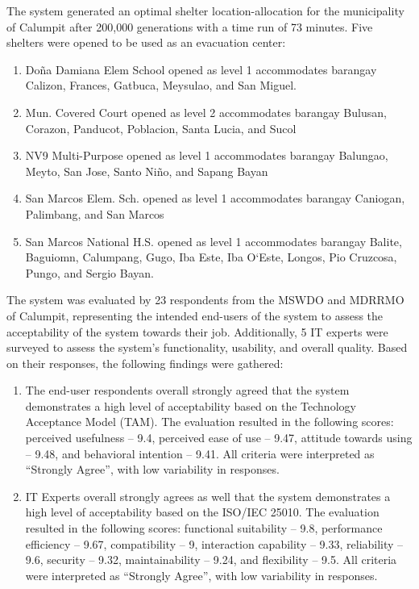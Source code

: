 	The system generated an optimal shelter location-allocation for the municipality of Calumpit after 200,000 generations with a time run of 73 minutes. Five shelters were opened to be used as an evacuation center: 
	
	\begin{enumerate}
		\item Doña Damiana Elem School opened as level 1 accommodates barangay Calizon, Frances, Gatbuca, Meysulao, and San Miguel.
		\item Mun. Covered Court opened as level 2 accommodates barangay Bulusan, Corazon, Panducot, Poblacion, Santa Lucia, and Sucol
		\item NV9 Multi-Purpose opened as level 1 accommodates barangay Balungao, Meyto, San Jose, Santo Niño, and Sapang Bayan
		\item San Marcos Elem. Sch. opened as level 1 accommodates barangay Caniogan, Palimbang, and San Marcos
		\item San Marcos National H.S. opened as level 1 accommodates barangay Balite, Baguiomn, Calumpang, Gugo, Iba Este, Iba O`Este, Longos, Pio Cruzcosa, Pungo, and Sergio Bayan.
	\end{enumerate}

	The system was evaluated by 23 respondents from the MSWDO and MDRRMO of Calumpit, representing the intended end-users of the system to assess the acceptability of the system towards their job. Additionally, 5 IT experts were surveyed to assess the system’s functionality, usability, and overall quality. Based on their responses, the following findings were gathered:
	
	\begin{enumerate}
		\item The end-user respondents overall strongly agreed that the system demonstrates a high level of acceptability based on the Technology Acceptance Model (TAM). The evaluation resulted in the following scores: perceived usefulness – 9.4, perceived ease of use – 9.47, attitude towards using – 9.48, and behavioral intention – 9.41. All criteria were interpreted as “Strongly Agree”, with low variability in responses.
		\item IT Experts overall strongly agrees as well that the system demonstrates a high level of acceptability based on the ISO/IEC 25010. The evaluation resulted in the following scores: functional suitability – 9.8, performance efficiency – 9.67, compatibility – 9, interaction capability – 9.33, reliability – 9.6, security – 9.32, maintainability – 9.24, and flexibility – 9.5. All criteria were interpreted as “Strongly Agree”, with low variability in responses.
	\end{enumerate}


